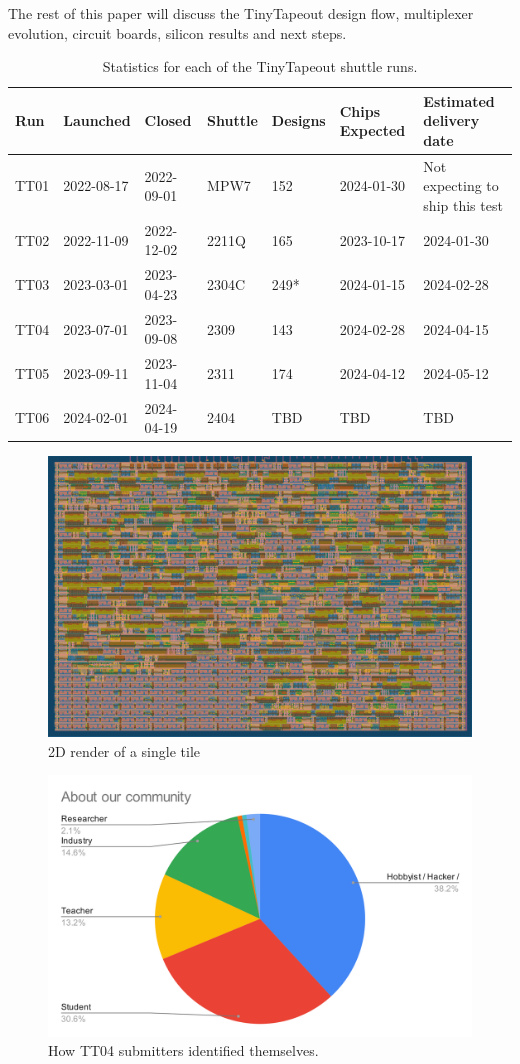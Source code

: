 The rest of this paper will discuss the TinyTapeout design flow, multiplexer evolution, circuit boards, silicon results and next steps.

\begin{table}[htbp]
\centering
\caption{Statistics for each of the TinyTapeout shuttle runs.}
\label{tab:tinytapeout}
\begin{tabularx}{\textwidth}{@{}l *{6}{X}@{}}
\toprule
\textbf{Run} & \textbf{Launched} & \textbf{Closed} & \textbf{Shuttle} & \textbf{Designs} & \textbf{Chips Expected} & \textbf{Estimated delivery date} \\
\midrule
TT01 & 2022-08-17 & 2022-09-01 & MPW7  & 152 & 2024-01-30 & Not expecting to ship this test \\
TT02 & 2022-11-09 & 2022-12-02 & 2211Q & 165 & 2023-10-17 & 2024-01-30 \\
TT03 & 2023-03-01 & 2023-04-23 & 2304C & 249* & 2024-01-15 & 2024-02-28 \\
TT04 & 2023-07-01 & 2023-09-08 & 2309  & 143 & 2024-02-28 & 2024-04-15 \\
TT05 & 2023-09-11 & 2023-11-04 & 2311  & 174 & 2024-04-12 & 2024-05-12 \\
TT06 & 2024-02-01 & 2024-04-19 & 2404  & TBD & TBD        & TBD \\
\bottomrule
\end{tabularx}
\end{table}

\begin{figure}[htp]
\centering
\includegraphics[width=\columnwidth]{./Figs/gh action gds layout.png}
\caption{2D render of a single tile}
\label{fig:render_cells_in_use}
\end{figure}

\begin{figure}[htp]
\centering
\includegraphics[width=\columnwidth]{./Figs/about our community pie chart.png}
\caption{How TT04 submitters identified themselves.}
\label{fig:TT04_submitters}
\end{figure}

